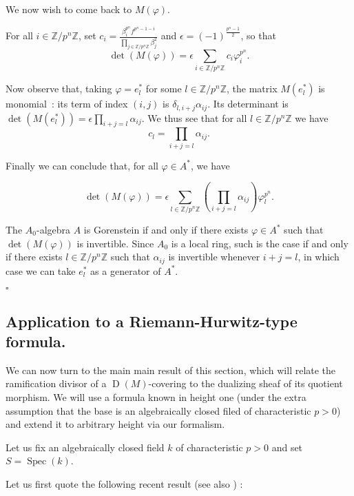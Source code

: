 \documentclass{amsart}
\newenvironment{demo}{{\flushleft \bf Proof~:}}{\hfill $\square$ \vspace{5mm}}
\theoremstyle{definition}
\theoremstyle{remark}
\begin{document}
\begin{demo}
We now wish to come back to $M(\varphi)$. 

For all $i \in {\mathbb{Z}}/ p^n {\mathbb{Z}}$, set $c_i = \frac{ \beta_i^{p^n} f^{p^n-1-i}}{\displaystyle\prod_{j \in {\mathbb{Z}} / p^n {\mathbb{Z}}} \beta_j^2}$ and $\epsilon = (-1)^{\frac{p^n-1}{2}}$, so that \[ \det(M(\varphi)) = \epsilon \displaystyle\sum_{i \in {\mathbb{Z}} / p^n {\mathbb{Z}}} c_i \varphi_i^{p^n}. \] 
 

Now observe that, taking $\varphi = e_l^*$ for some $l \in {\mathbb{Z}}/ p^n {\mathbb{Z}}$, the matrix $M(e_l^*)$ is monomial~: its term of index $(i,j)$ is $\delta_{l,i+j} \alpha_{ij}$.  Its determinant is $\det(M(e_l^*))= \epsilon \displaystyle\prod_{i+j=l} \alpha_{ij}$. We thus see that for all $l \in {\mathbb{Z}} / p^n {\mathbb{Z}}$ we have \[ c_l = \displaystyle\prod_{i+j = l} \alpha_{ij} .\]

Finally we can conclude that, for all $\varphi \in A^*$, we have 

\[ \det(M(\varphi)) = \epsilon \displaystyle\sum_{l \in {\mathbb{Z}} / p^n {\mathbb{Z}}} (\displaystyle\prod_{i+j = l} \alpha_{ij}) \varphi_l^{p^n}. \]

The $A_0$-algebra $A$ is Gorenstein if and only if there exists $\varphi \in A^*$ such that $\det(M(\varphi))$ is invertible. Since $A_0$ is a local ring, such is the case if and only if there exists $l \in {\mathbb{Z}}/ p^n {\mathbb{Z}} $ such that $\alpha_{ij}$ is invertible whenever $i+j = l$, in which case we can take $e_l^*$ as a generator of $A^*$.

\end{demo}

\subsection{Application to a Riemann-Hurwitz-type formula.}

We can now turn to the main main result of this section, which will relate the ramification divisor of a $\operatorname{D}(M)$-covering to the dualizing sheaf of its quotient morphism. We will use a formula known in height one (under the extra assumption that the base is an algebraically closed filed of characteristic $p>0$) and extend it to arbitrary height via our formalism.

Let us fix an algebraically closed field $k$ of characteristic $p>0$ and set $S=\operatorname{Spec}(k)$.

Let us first quote the following recent result (see also \cite{RS}) :
\end{document}
